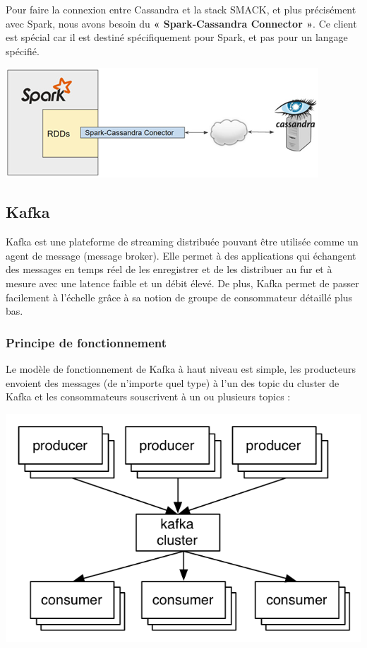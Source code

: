 \documentclass[a4paper, 11pt, titlepage]{article}
\begin{document}
Pour faire la connexion entre Cassandra et la stack SMACK, et plus précisément avec Spark, nous avons besoin du \textbf{« Spark-Cassandra Connector »}. Ce client est spécial car il est destiné spécifiquement pour Spark, et pas pour un langage spécifié.

\begin{center}
\includegraphics[scale=0.7]{res/spark_cass.png}
\end{center}

\newpage
\subsection {Kafka}

Kafka est une plateforme de streaming distribuée pouvant être utilisée comme un agent de message (message broker). Elle permet à des applications qui échangent des messages en temps réel de les enregistrer et de les distribuer au fur et à mesure avec une latence faible et un débit élevé. De plus, Kafka permet de passer facilement à l'échelle grâce à sa notion de groupe de consommateur détaillé plus bas.


\subsubsection* {Principe de fonctionnement}

Le modèle de fonctionnement de Kafka à haut niveau est simple, les producteurs envoient des messages (de n'importe quel type) à l'un des topic du cluster de Kafka et les consommateurs souscrivent à un ou plusieurs topics :

\begin{center}
\includegraphics[scale=0.8]{res/producer_consumer.png}
\end{center}
\end{document}
